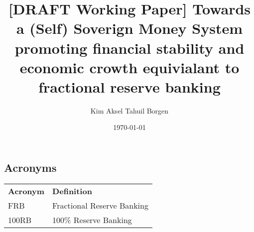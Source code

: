 \documentclass{article}
\title{[DRAFT Working Paper] Towards a (Self) Soverign Money System promoting financial stability and economic crowth equivialant to fractional reserve banking}
\author{Kim Aksel Tahuil Borgen}
\date{\today}
\begin{document}
\maketitle

\begin{abstract}
        
\end{abstract}
\subsection{Acronyms}

\begin{tabular}{ll}
\textbf{Acronym} & \textbf{Definition} \\
FRB & Fractional Reserve Banking \\
100RB & 100\% Reserve Banking \\
\end{tabular}





\printbibliography
\end{document}
